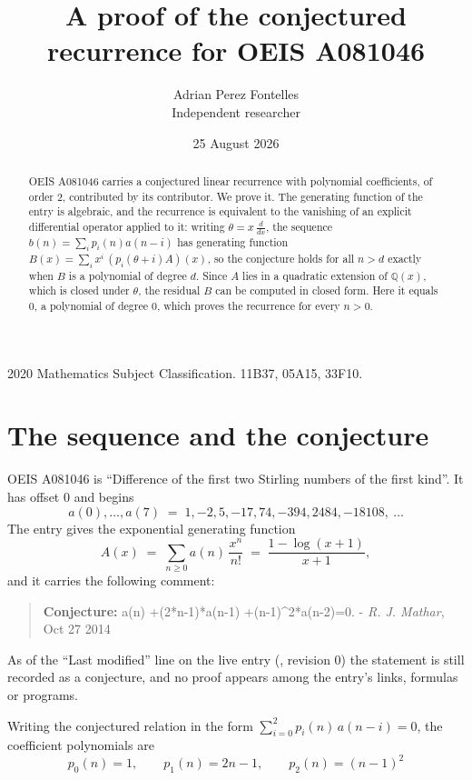 \documentclass[11pt,a4paper]{article}
\title{A proof of the conjectured recurrence for OEIS A081046}
\author{Adrian Perez Fontelles\\ \small Independent researcher}
\date{25 August 2026}
\theoremstyle{plain}
\theoremstyle{definition}
\begin{document}
\maketitle

\begin{abstract}
OEIS A081046 carries a conjectured linear recurrence with polynomial coefficients, of
order 2, contributed by its contributor. We prove it. The generating function of the
entry is algebraic, and the recurrence is equivalent to the vanishing of an explicit
differential operator applied to it: writing $\theta=x\,\frac{d}{dx}$, the sequence
$b(n)=\sum_{i}p_{i}(n)a(n-i)$ has generating function
$B(x)=\sum_{i}x^{i}\,(p_{i}(\theta+i)A)(x)$, so the conjecture holds for all $n>d$ exactly
when $B$ is a polynomial of degree $d$. Since $A$ lies in a quadratic extension of
$\mathbb{Q}(x)$, which is closed under $\theta$, the residual $B$ can be computed in
closed form. Here it equals $0$, a polynomial of degree $0$, which proves
the recurrence for every $n>0$.
\end{abstract}

\noindent\small 2020 Mathematics Subject Classification. 11B37, 05A15, 33F10.\normalsize

\section{The sequence and the conjecture}

OEIS A081046 is ``Difference of the first two Stirling numbers of the first kind''. It has offset $0$ and begins
\[
a(0),\dots,a(7)\;=\;1, -2, 5, -17, 74, -394, 2484, -18108,\ \dots
\]
The entry gives the exponential generating function
\begin{equation}\label{eq:gf}
A(x)\;=\;\sum_{n\ge 0} a(n)\,\frac{x^{n}}{n!}\;=\;\frac{1 - \log{\left(x + 1 \right)}}{x + 1} ,
\end{equation}
and it carries the following comment:
\begin{quote}\small
\textbf{Conjecture:} a(n) +(2*n-1)*a(n-1) +(n-1)\^{}2*a(n-2)=0. - \emph{R. J. Mathar}, Oct 27 2014
\end{quote}
As of the ``Last modified'' line on the live entry (, revision 0) the
statement is still recorded as a conjecture, and no proof appears among the entry's links,
formulas or programs.

Writing the conjectured relation in the form $\sum_{i=0}^{2}p_{i}(n)\,a(n-i)=0$,
the coefficient polynomials are
\[
p_{0}(n)=1,\qquad p_{1}(n)=2 n - 1,\qquad p_{2}(n)=\left(n - 1\right)^{2}
\]
\end{document}
